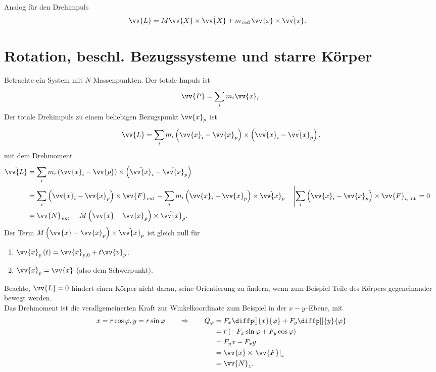 \documentclass[a4paper,12pt]{article}
\numberwithin{equation}{section}
\begin{document}
Analog für den Drehimpuls
\begin{align*}
        \vv{L}&=M\vv{X}\times \dot{\vv{X}}+m_{\,\text{red}\,}\vv{x}\times \dot{\vv{x}}
.\end{align*}

\newpage
\section{Rotation, beschl. Bezugssysteme und starre Körper}
Betrachte ein System mit $N$ Massenpunkten. Der totale Impuls ist 
\[ 
        \vv{P}=\sum_{i}^{}m_i\dot{\vv{x}}_i
.\] 
Der totale Drehimpuls zu einem beliebigen Bezugspunkt $\vv{x}_p$ ist
\[ 
        \vv{L}=\sum_{i}^{}m_i\left(\vv{x}_i-\vv{x}_p\right)\times \left(\dot{\vv{x}}_i-\dot{\vv{x}}_p\right)
,\] 
mit dem Drehmoment
\begin{align*}
        \dot{\vv{L}}&=\sum_{i}^{}m_i\left(\vv{x}_i-\vv{p}\right)\times \left(\ddot{\vv{x}}_i-\ddot{\vv{x}}_p\right)\\
                    &=\sum_{i}^{}\left(\vv{x}_i-\vv{x}_p\right)\times \vv{F}_{\,\text{ext}\,}-\sum_{i}^{}m_i\left(\vv{x}_i-\vv{x}_p\right)\times \ddot{\vv{x}}_p&&\left|\sum_{i}^{}\left(\vv{x}_i-\vv{x}_p\right)\times \vv{F}_{i,\,\text{int}\,}=0\right.\\
                    &=\vv{N}_{\,\text{ext}\,}-M\left(\vv{x}-\vv{x}_p\right)\times \ddot{\vv{x}}_p
.\end{align*}
Der Term $M\left(\vv{x}-\vv{x}_p\right)\times \ddot{\vv{x}}_p$ ist gleich null für
\begin{enumerate}[label=\arabic*.]
        \item $\vv{x}_p\left(t\right)=\vv{x}_{p,0}+t\vv{v}_p$.
        \item $\vv{x}_p=\vv{x}$ (also dem Schwerpunkt).
\end{enumerate}
Beachte, $\vv{L}=0$ hindert einen Körper nicht daran, seine Orientierung zu ändern, wenn zum Beispiel Teile des Körpers gegeneinander bewegt werden.\\\indent
Das Drehmoment ist die verallgemeinerten Kraft zur Winkelkoordinate zum Beispiel in der $x-y$--Ebene, mit
\begin{align*}
        x=r\cos \varphi ,y=r\sin \varphi\qquad  \Rightarrow\qquad  Q_\varphi &=F_x\diffp[]{x}{\varphi }+F_y\diffp[]{y}{\varphi }\\
                                                                             &=r\left(-F_x\sin \varphi +F_y\cos \varphi \right)\\
                                                                             &=F_yx-F_xy\\
                                                                             &=\vv{x}\times \left.\vv{F}\right|_z\\
                                                                             &=\vv{N}_z
.\end{align*}
\end{document}
